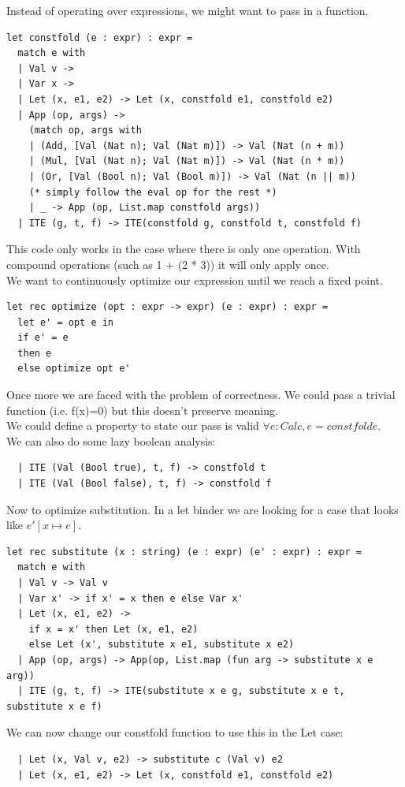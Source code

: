\newpage
Instead of operating over expressions, we might want to pass in a function.
\begin{lstlisting}
let constfold (e : expr) : expr =
  match e with 
  | Val v ->
  | Var x ->
  | Let (x, e1, e2) -> Let (x, constfold e1, constfold e2)
  | App (op, args) ->
    (match op, args with
    | (Add, [Val (Nat n); Val (Nat m)]) -> Val (Nat (n + m))
    | (Mul, [Val (Nat n); Val (Nat m)]) -> Val (Nat (n * m))
    | (Or, [Val (Bool n); Val (Bool m)]) -> Val (Nat (n || m))
    (* simply follow the eval op for the rest *)
    | _ -> App (op, List.map constfold args))
  | ITE (g, t, f) -> ITE(constfold g, constfold t, constfold f)
\end{lstlisting}
This code only works in the case where there is only one operation. With compound operations (such as 1 + (2 * 3)) it will only apply once.
\\
We want to continuously optimize our expression until we reach a fixed point.
\begin{lstlisting}
let rec optimize (opt : expr -> expr) (e : expr) : expr = 
  let e' = opt e in
  if e' = e
  then e
  else optimize opt e'
\end{lstlisting}
Once more we are faced with the problem of correctness. We could pass a trivial function (i.e. f(x)=0) but this doesn't preserve meaning.
\\
We could define a property to state our pass is valid $\forall e : Calc, e = constfold e$.
\\
We can also do some lazy boolean analysis:
\begin{lstlisting}
  | ITE (Val (Bool true), t, f) -> constfold t
  | ITE (Val (Bool false), t, f) -> constfold f
\end{lstlisting}
Now to optimize substitution. In a let binder we are looking for a case that looks like $e'[x \mapsto e]$.
\begin{lstlisting}
let rec substitute (x : string) (e : expr) (e' : expr) : expr =
  match e with
  | Val v -> Val v
  | Var x' -> if x' = x then e else Var x'
  | Let (x, e1, e2) -> 
    if x = x' then Let (x, e1, e2)
    else Let (x', substitute x e1, substitute x e2)
  | App (op, args) -> App(op, List.map (fun arg -> substitute x e arg))
  | ITE (g, t, f) -> ITE(substitute x e g, substitute x e t, substitute x e f)
\end{lstlisting}
We can now change our constfold function to use this in the Let case:
\begin{lstlisting}
  | Let (x, Val v, e2) -> substitute c (Val v) e2
  | Let (x, e1, e2) -> Let (x, constfold e1, constfold e2)
\end{lstlisting}
